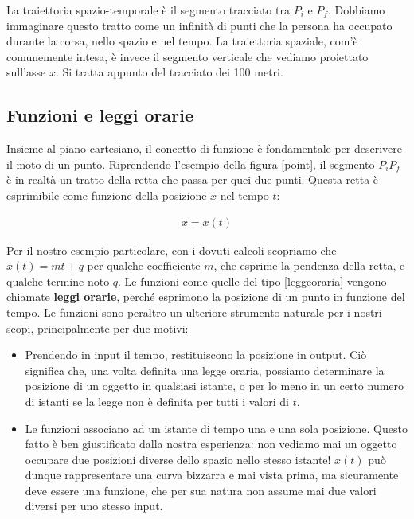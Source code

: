 La traiettoria spazio-temporale è il segmento tracciato tra $P_i$ e $P_f$.
Dobbiamo immaginare questo tratto come un infinità di punti che la persona
ha occupato durante la corsa, nello spazio e nel tempo. La traiettoria
spaziale, com'è comunemente intesa, è invece il segmento verticale che
vediamo proiettato sull'asse $x$. Si tratta appunto del tracciato dei
100 metri.

\subsection{Funzioni e leggi orarie}
Insieme al piano cartesiano, il concetto di funzione è fondamentale per
descrivere il moto di un punto. Riprendendo l'esempio della figura
\ref{point}, il segmento $P_iP_f$ è in realtà un tratto della retta
che passa per quei due punti. Questa retta è esprimibile come funzione
della posizione $x$ nel tempo $t$:

\begin{align}
    x = x(t)\label{leggeoraria}
\end{align}

\noindent Per il nostro esempio particolare, con i dovuti calcoli
scopriamo che $x(t) = mt + q$ per qualche coefficiente $m$, che esprime
la pendenza della retta, e qualche termine noto $q$.
Le funzioni come quelle del tipo \ref{leggeoraria} vengono chiamate
\textbf{leggi orarie}, perché esprimono la posizione di un punto in
funzione del tempo.
Le funzioni sono peraltro un ulteriore strumento naturale
per i nostri scopi, principalmente per due motivi:
\begin{itemize}
    \item Prendendo in input il tempo, restituiscono la posizione in
    output. Ciò significa che, una volta definita una legge oraria,
    possiamo determinare la posizione di un oggetto in qualsiasi
    istante, o per lo meno in un certo numero di istanti se la
    legge non è definita per tutti i valori di $t$.

    \item Le funzioni associano ad un istante di tempo una e una sola
    posizione. Questo fatto è ben giustificato dalla nostra esperienza:
    non vediamo mai un oggetto occupare due posizioni diverse dello
    spazio nello stesso istante! $x(t)$ può dunque rappresentare una
    curva bizzarra e mai vista prima, ma sicuramente deve essere
    una funzione, che per sua natura non assume mai due valori diversi
    per uno stesso input.
\end{itemize}

